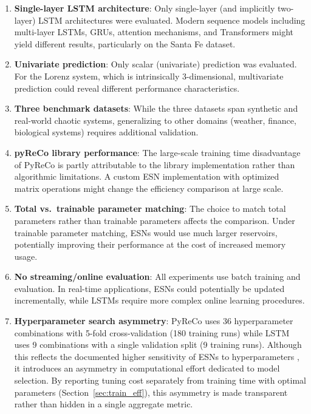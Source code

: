 \begin{enumerate}
    \item \textbf{Single-layer LSTM architecture}: Only single-layer (and implicitly two-layer) LSTM architectures were evaluated. Modern sequence models including multi-layer LSTMs, GRUs, attention mechanisms, and Transformers might yield different results, particularly on the Santa Fe dataset.

    \item \textbf{Univariate prediction}: Only scalar (univariate) prediction was evaluated. For the Lorenz system, which is intrinsically 3-dimensional, multivariate prediction could reveal different performance characteristics.

    \item \textbf{Three benchmark datasets}: While the three datasets span synthetic and real-world chaotic systems, generalizing to other domains (weather, finance, biological systems) requires additional validation.

    \item \textbf{pyReCo library performance}: The large-scale training time disadvantage of PyReCo is partly attributable to the library implementation rather than algorithmic limitations. A custom ESN implementation with optimized matrix operations might change the efficiency comparison at large scale.

    \item \textbf{Total vs.\ trainable parameter matching}: The choice to match total parameters rather than trainable parameters affects the comparison. Under trainable parameter matching, ESNs would use much larger reservoirs, potentially improving their performance at the cost of increased memory usage.

    \item \textbf{No streaming/online evaluation}: All experiments use batch training and evaluation. In real-time applications, ESNs could potentially be updated incrementally, while LSTMs require more complex online learning procedures.

    \item \textbf{Hyperparameter search asymmetry}: PyReCo uses 36 hyperparameter combinations with 5-fold cross-validation (180 training runs) while LSTM uses 9 combinations with a single validation split (9 training runs). Although this reflects the documented higher sensitivity of ESNs to hyperparameters \cite{matzner2022hyperparameter}, it introduces an asymmetry in computational effort dedicated to model selection. By reporting tuning cost separately from training time with optimal parameters (Section~\ref{sec:train_eff}), this asymmetry is made transparent rather than hidden in a single aggregate metric.
\end{enumerate}

